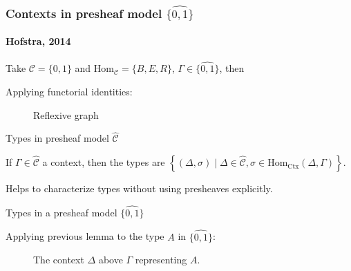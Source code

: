 \documentclass[english,handout]{beamer}
\newcommand{\fig}[2]{
    \begin{figure}\begin{center}\texttt{[image: figures/\#1]}\caption{#2\label{#1}}\end{center}
    \end{figure}}
\newcommand{\tcol}[2]{
    \begin{columns}
        \column{.5\textwidth}
        #1
        \column{.5\textwidth}
        #2
    \end{columns}
}
\begin{document}
   \begin{frame}[fragile]
   \frametitle{Contexts in presheaf model $\widehat{\{0,1\}}$}
\framesubtitle{Hofstra, 2014}
    \begin{example}    
    Take $\mathcal{C} = \{0,1\}$ and $\text{Hom}_{\mathcal{C}}= \{B,E,R\}$, $\Gamma \in \widehat{\{0,1\}}$, then 
    
   
    
    Applying functorial identities:
    \begin{figure}
    \begin{centering}
        
    \end{centering}
    \caption{Reflexive graph}
    \end{figure}
   \end{example} 
\end{frame}

\begin{frame}{Types in  presheaf model $\widehat{\mathcal{C}}$}
    
    
    \begin{lemma}
        If $\Gamma \in \widehat{\mathcal{C}}$ a context, then the types are $ \left\{ (\Delta, \sigma) \mid \Delta \in \widehat{\mathcal{C}}, \sigma \in \text{Hom}_{\text{Ctx}}(\Delta , \Gamma) \right\}$.
     \end{lemma}

     
     Helps to characterize types without using presheaves explicitly.
\end{frame}


\begin{frame}{Types in a presheaf model $\widehat{\{0, 1 \}}$}
  \begin{example}
  Applying previous lemma to the type $A$ in $\widehat{\{0, 1 \}}$:
\begin{figure}
\centering
  
  \caption{The context $\Delta$ above $\Gamma$ representing $A$.}
  \end{figure}
 \end{example}


\end{frame}
\end{document}
